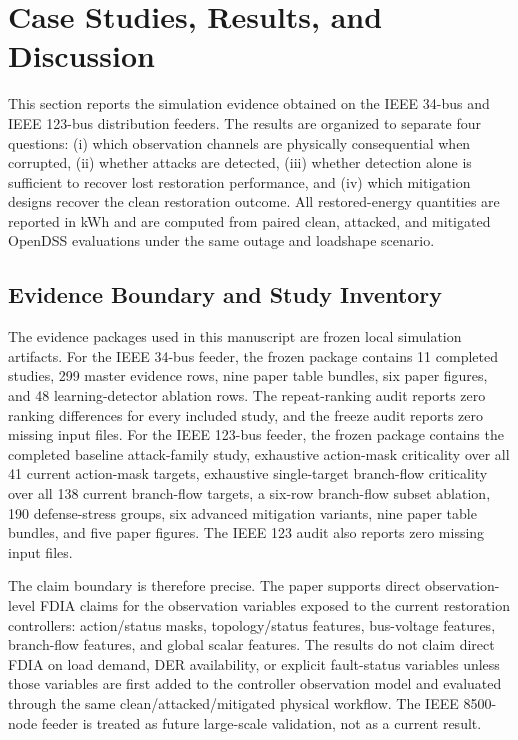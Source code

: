 % 

\section{Case Studies, Results, and Discussion}
\label{sec:case_studies_results}

This section reports the simulation evidence obtained on the IEEE 34-bus and IEEE 123-bus distribution feeders. The results are organized to separate four questions: (i) which observation channels are physically consequential when corrupted, (ii) whether attacks are detected, (iii) whether detection alone is sufficient to recover lost restoration performance, and (iv) which mitigation designs recover the clean restoration outcome. All restored-energy quantities are reported in kWh and are computed from paired clean, attacked, and mitigated OpenDSS evaluations under the same outage and loadshape scenario.

\subsection{Evidence Boundary and Study Inventory}
\label{subsec:evidence_boundary_inventory}

The evidence packages used in this manuscript are frozen local simulation artifacts. For the IEEE 34-bus feeder, the frozen package contains 11 completed studies, 299 master evidence rows, nine paper table bundles, six paper figures, and 48 learning-detector ablation rows. The repeat-ranking audit reports zero ranking differences for every included study, and the freeze audit reports zero missing input files. For the IEEE 123-bus feeder, the frozen package contains the completed baseline attack-family study, exhaustive action-mask criticality over all 41 current action-mask targets, exhaustive single-target branch-flow criticality over all 138 current branch-flow targets, a six-row branch-flow subset ablation, 190 defense-stress groups, six advanced mitigation variants, nine paper table bundles, and five paper figures. The IEEE 123 audit also reports zero missing input files.

The claim boundary is therefore precise. The paper supports direct observation-level FDIA claims for the observation variables exposed to the current restoration controllers: action/status masks, topology/status features, bus-voltage features, branch-flow features, and global scalar features. The results do not claim direct FDIA on load demand, DER availability, or explicit fault-status variables unless those variables are first added to the controller observation model and evaluated through the same clean/attacked/mitigated physical workflow. The IEEE 8500-node feeder is treated as future large-scale validation, not as a current result.

